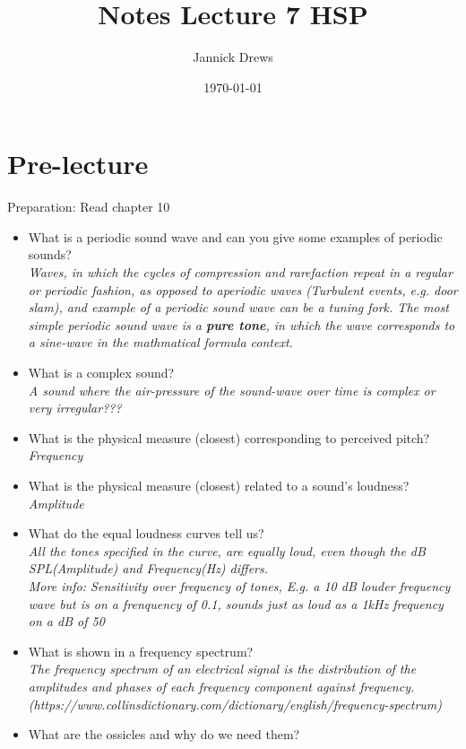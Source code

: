 \documentclass{article}
\title{Notes Lecture 7 HSP}
\author{Jannick Drews}
\date{\today}
\begin{document}
\maketitle
\newpage

\section{Pre-lecture}
Preparation: Read chapter 10\\
\begin{itemize}
  \item What is a periodic sound wave and can you give some examples of periodic sounds?\\
    \textit{Waves, in which the cycles of compression and rarefaction repeat in a regular or periodic fashion, as opposed to aperiodic waves (Turbulent events, e.g. door slam), and example of a periodic sound wave can be a tuning fork. The most simple periodic sound wave is a \textbf{pure tone}, in which the wave corresponds to a sine-wave in the mathmatical formula context.}
  \item What is a complex sound?\\
    \textit{A sound where the air-pressure of the sound-wave over time is complex or very irregular???}
  \item What is the physical measure (closest) corresponding to perceived pitch?\\
    \textit{Frequency}
  \item What is the physical measure (closest) related to a sound's loudness?\\
    \textit{Amplitude}
  \item What do the equal loudness curves tell us?\\
    \textit{All the tones specified in the curve, are equally loud, even though the dB SPL(Amplitude) and Frequency(Hz) differs.\\More info: Sensitivity over frequency of tones, E.g. a 10 dB louder frequency wave but is on a frenquency of 0.1, sounds just as loud as a 1kHz frequency on a dB of 50}
  \item What is shown in a frequency spectrum?\\
    \textit{The frequency spectrum of an electrical signal is the distribution of the amplitudes and phases of each frequency component against frequency.\\(https://www.collinsdictionary.com/dictionary/english/frequency-spectrum)}
  \item What are the ossicles and why do we need them?\\

\end{itemize}
\end{document}
